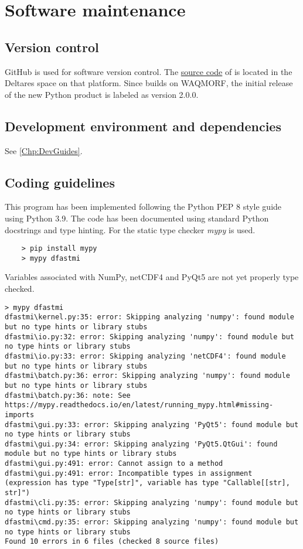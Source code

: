\chapter{Software maintenance}

\section{Version control}

GitHub is used for software version control.
The \href{https://github.com/Deltares/D-FAST_Morphological_Impact}{source code} of \dfastmi is located in the Deltares space on that platform.
Since \dfastmi builds on WAQMORF, the initial release of the new Python product is labeled as version 2.0.0.

\section{Development environment and dependencies}

See \autoref{Chp:DevGuides}.

\section{Coding guidelines}

This program has been implemented following the Python PEP 8 style guide using Python 3.9.
The code has been documented using standard Python docstrings and type hinting.
For the static type checker \emph{mypy} is used.

\begin{Verbatim}
    > pip install mypy
    > mypy dfastmi
\end{Verbatim}

Variables associated with NumPy, netCDF4 and PyQt5 are not yet properly type checked.

\begin{Verbatim}[fontsize=\tiny]
> mypy dfastmi
dfastmi\kernel.py:35: error: Skipping analyzing 'numpy': found module but no type hints or library stubs
dfastmi\io.py:32: error: Skipping analyzing 'numpy': found module but no type hints or library stubs
dfastmi\io.py:33: error: Skipping analyzing 'netCDF4': found module but no type hints or library stubs
dfastmi\batch.py:36: error: Skipping analyzing 'numpy': found module but no type hints or library stubs
dfastmi\batch.py:36: note: See https://mypy.readthedocs.io/en/latest/running_mypy.html#missing-imports
dfastmi\gui.py:33: error: Skipping analyzing 'PyQt5': found module but no type hints or library stubs
dfastmi\gui.py:34: error: Skipping analyzing 'PyQt5.QtGui': found module but no type hints or library stubs
dfastmi\gui.py:491: error: Cannot assign to a method
dfastmi\gui.py:491: error: Incompatible types in assignment (expression has type "Type[str]", variable has type "Callable[[str], str]")
dfastmi\cli.py:35: error: Skipping analyzing 'numpy': found module but no type hints or library stubs
dfastmi\cmd.py:35: error: Skipping analyzing 'numpy': found module but no type hints or library stubs
Found 10 errors in 6 files (checked 8 source files)
\end{Verbatim}

